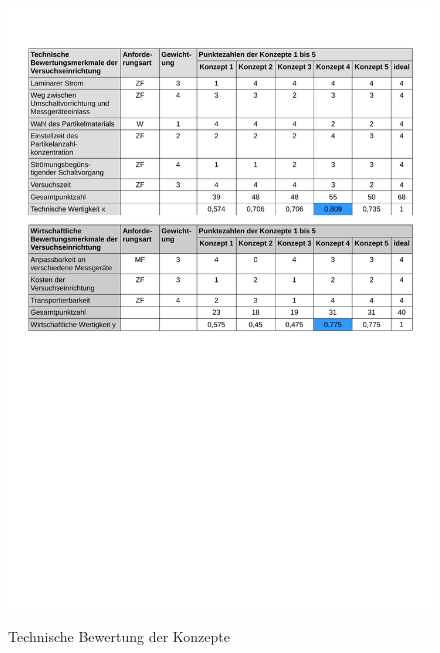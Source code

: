 \begin{figure}[H]
        \myfloatalign
        {\includegraphics[width=.8\linewidth]{gfx/conclusion/TabEvalTwo.pdf}} \quad
        \caption[Technische Bewertung der Konzepte]
        {Technische Bewertung der Konzepte}
        \label{fig:TabEvalOne}
\end{figure}
